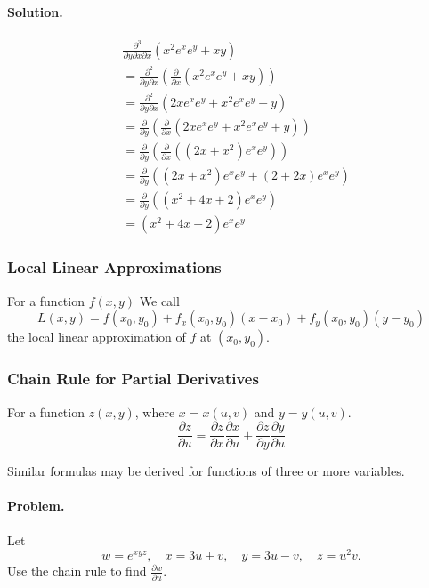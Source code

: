\documentclass[12pt, oneside]{book}
\begin{document}
\paragraph{Solution.}
\begin{align*}
    &\frac{\partial^3}{\partial y \partial x \partial x} \left(x^2 e^x e^y + xy\right) \\
    &=\frac{\partial^2}{\partial y \partial x} \left(\frac{\partial}{\partial x} \left(x^2 e^x e^y + xy\right)\right) \\
    &=\frac{\partial^2}{\partial y \partial x} \left(2x e^x e^y + x^2 e^x e^y + y\right) \\
    &=\frac{\partial}{\partial y} \left(\frac{\partial}{\partial x} \left(2x e^x e^y + x^2 e^x e^y + y\right)\right) \\
    &=\frac{\partial}{\partial y} \left(\frac{\partial}{\partial x} \left(\left(2x + x^2\right) e^x e^y\right)\right) \\
    &=\frac{\partial}{\partial y} \left(\left(2x + x^2\right) e^x e^y + \left(2 + 2x\right) e^x e^y\right) \\
    &=\frac{\partial}{\partial y} \left(\left(x^2 + 4x + 2\right) e^x e^y\right) \\
    &= \left(x^2 + 4x + 2\right) e^x e^y
\end{align*}

\subsubsection{Local Linear Approximations}
For a function \(f\left(x, y\right)\) We call
\[L\left(x, y\right) = f\left(x_0, y_0\right) + f_x\left(x_0, y_0\right)\left(x - x_0\right) + f_y\left(x_0, y_0\right)\left(y - y_0\right)\]
the local linear approximation of \(f\) at \(\left(x_0, y_0\right)\).

\subsubsection{Chain Rule for Partial Derivatives}
For a function \(z\left(x, y\right)\), where \(x = x\left(u, v\right)\) and \(y = y\left(u, v\right)\).
\[\frac{\partial z}{\partial u} = \frac{\partial z}{\partial x}\frac{\partial x}{\partial u} + \frac{\partial z}{\partial y}\frac{\partial y}{\partial u}\]

Similar formulas may be derived for functions of three or more variables.

\paragraph{Problem.} Let
\[w = e^{xyz}, \quad x = 3u + v, \quad y = 3u - v, \quad z = u^2v.\]
Use the chain rule to find \(\frac{\partial w}{\partial u}\). \cite{anton-bivens-davis}
\end{document}
